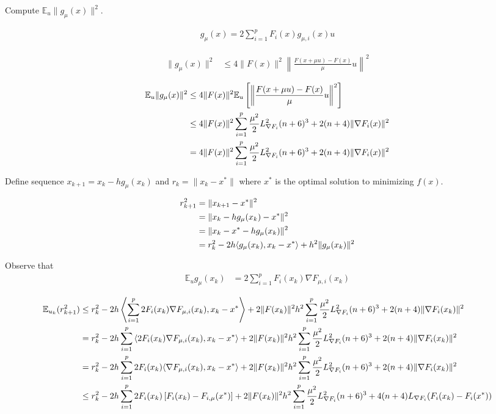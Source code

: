 \documentclass{article}
\begin{document}
Compute $\mathbb{E}_u\|g_{\mu}(x)\|^2$.

\begin{align}
g_{\mu}(x) = 2\sum_{i=1}^pF_i(x)g_{\mu,i}(x)u
\end{align}

\begin{align}
\|g_{\mu}(x)\|^2 & \leq 4\|F(x)\|^2\left\| \frac{F(x+\mu u)-F(x)}{\mu}u \right\|^2
\end{align}

\begin{align}
\mathbb{E}_u\|g_{\mu}(x)\|^2 & \leq 4\|F(x)\|^2 \mathbb{E}_u\left[\left\| \frac{F(x+\mu u)-F(x)}{\mu}u \right\|^2\right] \notag \\ & \leq 4\|F(x)\|^2\sum_{i=1}^p\frac{\mu^2}{2}L_{\nabla F_i}^2(n+6)^3 + 2(n+4)\|\nabla F_i(x)\|^2 \notag \\ & = 4\|F(x)\|^2\sum_{i=1}^p\frac{\mu^2}{2}L_{\nabla F_i}^2(n+6)^3 + 2(n+4)\|\nabla F_i(x)\|^2 \label{scheme_3_second_moment}
\end{align}

Define sequence $x_{k+1} = x_k - hg_{\mu}(x_k)$ and $r_k = \|x_k-x^*\|$ where $x^*$ is the optimal solution to minimizing $f(x)$. \newline 

\begin{align}
r_{k+1}^2 & = \|x_{k+1} - x^*\|^2\notag  \\ & = \|x_k - hg_{\mu}(x_k) - x^*\|^2 \notag \\ & = \|x_k - x^* - hg_{\mu}(x_k)\|^2 \notag \\ & = r_k^2 - 2h\langle g_{\mu}(x_k),x_k-x^*\rangle + h^2\| g_{\mu}(x_k)\|^2
\end{align}

Observe that
\begin{align}
\mathbb{E}_ug_{\mu}(x_k) & = 2\sum_{i=1}^pF_i(x_k)\nabla F_{\mu,i}(x_k)
\end{align}

\begin{align}
\mathbb{E}_{u_k}(r_{k+1}^2) & \leq r_k^2 - 2h\left\langle \sum_{i=1}^p 2F_i(x_k)\nabla F_{\mu,i}(x_k), x_k - x^*\right\rangle + 2\|F(x_k)\|^2h^2\sum_{i=1}^p\frac{\mu^2}{2}L_{\nabla F_i}^2(n+6)^3 + 2(n+4)\|\nabla F_i(x_k)\|^2 \notag \\ & = r_k^2 - 2h\sum_{i=1}^p\left\langle 2F_i(x_k)\nabla F_{\mu,i}(x_k), x_k - x^*\right\rangle + 2\|F(x_k)\|^2h^2\sum_{i=1}^p\frac{\mu^2}{2}L_{\nabla F_i}^2(n+6)^3 + 2(n+4)\|\nabla F_i(x_k)\|^2 \notag  \\ & = r_k^2 - 2h\sum_{i=1}^p2F_i(x_k)\langle \nabla F_{\mu,i}(x_k), x_k - x^*\rangle + 2\|F(x_k)\|^2h^2\sum_{i=1}^p\frac{\mu^2}{2}L_{\nabla F_i}^2(n+6)^3 + 2(n+4)\|\nabla F_i(x_k)\|^2 \notag \\ & \leq r_k^2 - 2h\sum_{i=1}^p2F_i(x_k)\left[F_i(x_k) - F_{i,\mu}(x^*)\right] + 2\|F(x_k)\|^2h^2\sum_{i=1}^p\frac{\mu^2}{2}L_{\nabla F_i}^2(n+6)^3 + 4(n+4)L_{\nabla F_i}(F_i(x_k) - F_i(x^*))
\end{align}
\end{document}
